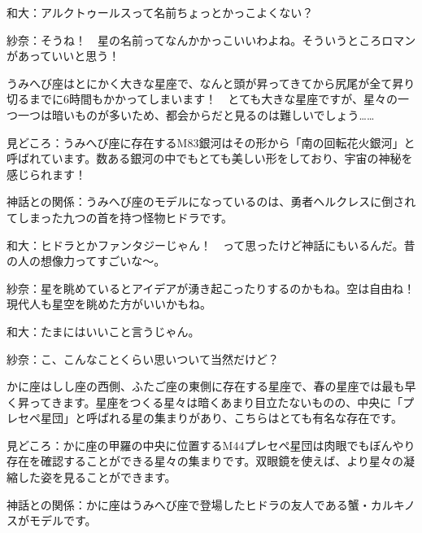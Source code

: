 \documentclass[supernova_2023]{subfiles}
\begin{document}
\phantom{a}\par
和大：アルクトゥールスって名前ちょっとかっこよくない？　


\phantom{a}\par
紗奈：そうね！　星の名前ってなんかかっこいいわよね。そういうところロマンがあっていいと思う！


\phantom{a}\par
{}
{}
\begin{tcolorbox}[title=4. うみへび座, breakable]
うみへび座はとにかく大きな星座で、なんと頭が昇ってきてから尻尾が全て昇り切るまでに6時間もかかってしまいます！　とても大きな星座ですが、星々の一つ一つは暗いものが多いため、都会からだと見るのは難しいでしょう……


\phantom{a}\par
見どころ：うみへび座に存在するM83銀河はその形から「南の回転花火銀河」と呼ばれています。数ある銀河の中でもとても美しい形をしており、宇宙の神秘を感じられます！


\phantom{a}\par
神話との関係：うみへび座のモデルになっているのは、勇者ヘルクレスに倒されてしまった九つの首を持つ怪物ヒドラです。  
\end{tcolorbox}

\phantom{a}\par
和大：ヒドラとかファンタジーじゃん！　って思ったけど神話にもいるんだ。昔の人の想像力ってすごいな〜。


\phantom{a}\par
紗奈：星を眺めているとアイデアが湧き起こったりするのかもね。空は自由ね！　現代人も星空を眺めた方がいいかもね。


\phantom{a}\par
和大：たまにはいいこと言うじゃん。


\phantom{a}\par
紗奈：こ、こんなことくらい思いついて当然だけど？


\phantom{a}\par
{}
{}
\begin{tcolorbox}[title=5. かに座, breakable]
かに座はしし座の西側、ふたご座の東側に存在する星座で、春の星座では最も早く昇ってきます。星座をつくる星々は暗くあまり目立たないものの、中央に「プレセペ星団」と呼ばれる星の集まりがあり、こちらはとても有名な存在です。


\phantom{a}\par
見どころ：かに座の甲羅の中央に位置するM44プレセペ星団は肉眼でもぼんやり存在を確認することができる星々の集まりです。双眼鏡を使えば、より星々の凝縮した姿を見ることができます。


\phantom{a}\par
神話との関係：かに座はうみへび座で登場したヒドラの友人である蟹・カルキノスがモデルです。  
\end{tcolorbox}
\end{document}
